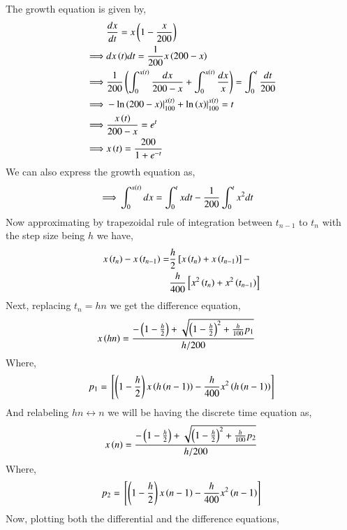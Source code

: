\documentclass[journal,12pt,twocolumn]{IEEEtran}
\theoremstyle{remark}
\begin{document}
\solution

The growth equation is given by,
\begin{align}
    &\frac{dx}{dt}=x\left(1-\frac{x}{200}\right) \\
    \implies &{dx\left(t\right)}{dt}=\frac{1}{200}x\left(200-x\right) \\
    \implies &\frac{1}{200}\left(\int_{0}^{x\left(t\right)}\frac{dx}{200-x}+\int_{0}^{x\left(t\right)}\frac{dx}{x}\right)=\int_{0}^{t}\frac{dt}{200} \\
    \implies &-\ln{\ensuremath{\left(200-x\right)}}|_{100}^{x\left(t\right)}+\ln{\ensuremath{\left(x\right)}}|_{100}^{x\left(t\right)}=t \\
    \implies &\frac{x\left(t\right)}{200-x}=e^t \\
    \implies &x\left(t\right)=\frac{200}{1+e^{-t}}
\end{align}
We can also express the growth equation as,
\begin{align}
    \implies &\int_{0}^{x\left(t\right)}dx=\int_{0}^{t}xdt-\frac{1}{200}\int_{0}^{t}x^2dt
\end{align}
Now approximating by trapezoidal rule of integration between $t_{n-1}$ to $t_n$ with the step size being $h$ we have,
\begin{align}
    \begin{split}
        x\left(t_n\right)-x\left(t_{n-1}\right)=&\frac{h}{2}{}\left[x\left(t_n\right)+x\left(t_{n-1}\right)\right]- \\
        &\frac{h}{400}{}\left[x^2\left(t_n\right)+x^2\left(t_{n-1}\right)\right]
    \end{split}
\end{align}
Next, replacing $t_{n}=hn$ we get the difference equation,
\begin{align}
    &x\left(hn\right)=\frac{-\left(1-\frac{h}{2}\right)+\sqrt{\left(1-\frac{h}{2}\right)^2+\frac{h}{100}p_1}}{h/200}
\end{align}
Where,
\begin{align}
    p_1={}\left[\left(1-\frac{h}{2}\right)x\left(h\left(n-1\right)\right)-\frac{h}{400}x^2\left(h\left(n-1\right)\right)\right]
\end{align}
And relabeling $hn\longleftrightarrow n$ we will be having the discrete time equation as,
\begin{align}
    x\left(n\right)=\frac{-\left(1-\frac{h}{2}\right)+\sqrt{\left(1-\frac{h}{2}\right)^2+\frac{h}{100}p_2}}{h/200} \label{eq:A}
\end{align}
Where,
\begin{align}
    p_2={}\left[\left(1-\frac{h}{2}\right)x\left(n-1\right)-\frac{h}{400}x^2\left(n-1\right)\right]
\end{align}
Now, plotting both the differential and the difference equations,
\end{document}
